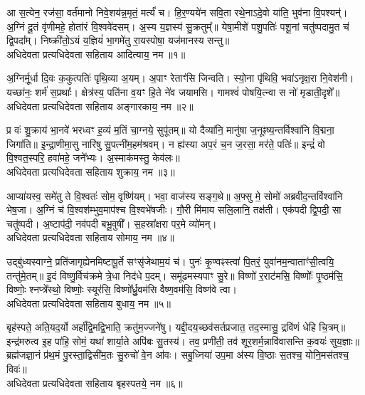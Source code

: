 

आ स॒त्येन॒ रज॑सा॒ वर्त॑मानो निवे॒शय॑न्न॒मृतं॒ मर्त्यं॑ च। हि॒र॒ण्यये॑न सवि॒ता रथे॒नाऽदे॒वो या॑ति॒ भुव॑ना वि॒पश्यन्॑। अ॒ग्निं दू॒तं वृ॑णीमहे॒ होता॑रं वि॒श्ववे॑दसम्। अ॒स्य य॒ज्ञस्य॑ सु॒क्रतुम्᳚॥ येषा॒मीशे॑ पशु॒पतिः॑ पशू॒नां चतु॑ष्पदामु॒त च॑ द्वि॒पदा᳚म्। निष्क्री॑तो॒ऽयं य॒ज्ञियं॑ भा॒गमे॑तु रा॒यस्पोषा॒ यज॑मानस्य सन्तु॥ \\
अधिदेवता प्रत्यधिदेवता सहिताय आदित्याय॒ नम॥१॥ 

अ॒ग्निर्मू॒र्धा दि॒वः क॒कुत्पतिः॑ पृथि॒व्या अ॒यम्। अ॒पाꣳ रेताꣳ॑सि जिन्वति। स्यो॒ना पृ॑थिवि॒ भवा॑ऽनृक्ष॒रा नि॒वेश॑नी। यच्छा॑नः॒ शर्म॑ स॒प्रथाः᳚। क्षेत्र॑स्य॒ पति॑ना व॒यꣳ हि॒ते ने॑व जयामसि। गामश्वं॑ पोषयि॒त्न्वा स नो॑ मृडाती॒दृशे᳚॥ \\
अधिदेवता प्रत्यधिदेवता सहिताय अङ्गारकाय॒ नम॥२॥ 

प्र वः॑ शु॒क्राय॑ भा॒नवे॑ भरध्वꣳ ह॒व्यं म॒तिं चा॒ग्नये॒ सुपू॑तम्॥ यो दैव्या॑नि॒ मानु॑षा ज॒नूꣴष्य॒न्तर्विश्वा॑नि वि॒द्मना॒ जिगा॑ति॥ इ॒न्द्रा॒णीमा॒सु नारि॑षु सु॒पत्नी॑म॒हम॑श्रवम्। न ह्य॑स्या अप॒रं च॒न ज॒रसा॒ मर॑ते॒ पतिः॑॥ इन्द्रं॑ वो वि॒श्वत॒स्परि॒ हवा॑महे॒ जने᳚भ्यः। अ॒स्माक॑मस्तु॒ केव॑लः॥ \\
अधिदेवता प्रत्यधिदेवता सहिताय शुक्राय॒ नम॥३॥ 

आप्या॑यस्व॒ समे॑तु ते वि॒श्वतः॑ सोम॒ वृष्णि॑यम्। भवा॒ वाज॑स्य सङ्ग॒थे॥ अ॒फ्सु मे॒ सोमो॑ अब्रवीद॒न्तर्विश्वा॑नि भेष॒जा। अ॒ग्निं च॑ वि॒श्वश॑म्भुव॒माप॑श्च वि॒श्वभे॑षजीः। गौ॒री मि॑माय सलि॒लानि॒ तक्ष॑ती। एक॑पदी द्वि॒पदी॒ सा चतु॑ष्पदी। अ॒ष्टाप॑दी॒ नव॑पदी बभू॒वुषी᳚। स॒हस्रा᳚क्षरा पर॒मे व्यो॑मन्। \\
अधिदेवता प्रत्यधिदेवता सहिताय सोमाय॒ नम॥४॥ 

उद्बु॑ध्यस्वाग्ने॒ प्रति॑जागृह्येनमिष्टापू॒र्ते सꣳसृ॑जेथाम॒यं च॑। पुनः॑ कृ॒ण्वꣴस्त्वा॑ पि॒तरं॒ युवा॑नम॒न्वाताꣳ॑सी॒त्वयि॒ तन्तु॑मे॒तम्॥ इ॒दं विष्णु॒र्विच॑क्रमे त्रे॒धा निद॑धे प॒दम्। समू॑ढमस्यपाꣳ सु॒रे॥ विष्णो॑ र॒राट॑मसि॒ विष्णोः᳚ पृ॒ष्ठम॑सि॒ विष्णोः॒ श्नप्त्रे᳚स्थो॒ विष्णोः॒ स्यूर॑सि॒ विष्णो᳚र्ध्रु॒वम॑सि वैष्ण॒वम॑सि॒ विष्ण॑वे त्वा। \\
अधिदेवता प्रत्यधिदेवता सहिताय बुधाय॒ नम॥५॥ 

बृह॑स्पते॒ अति॒यद॒र्यो अर्हा᳚द्वि॒मद्वि॒भाति॒ क्रतु॑म॒ज्जने॑षु। यद्दी॒दय॒च्छव॑सर्त\-प्रजात॒ तद॒स्मासु॒ द्रवि॑णं धेहि चि॒त्रम्॥ इन्द्र॑मरुत्व इ॒ह पा॑हि॒ सोमं॒ यथा॑ शार्या॒ते अपि॑बः सु॒तस्य॑। तव॒ प्रणी॑ती॒ तव॑ शूर॒शर्म॒न्नावि॑वासन्ति क॒वयः॑ सुय॒ज्ञाः॥ ब्रह्म॑जज्ञा॒नं प्र॑थ॒मं पु॒रस्ता॒द्विसी॑म॒तः सु॒रुचो॑ वे॒न आ॑वः। सबु॒ध्निया॑ उप॒मा अ॑स्य वि॒ष्ठाः स॒तश्च॒ योनि॒मस॑तश्च॒ विवः॑॥\\
अधिदेवता प्रत्यधिदेवता सहिताय बृहस्पतये॒ नम॥६॥ 

